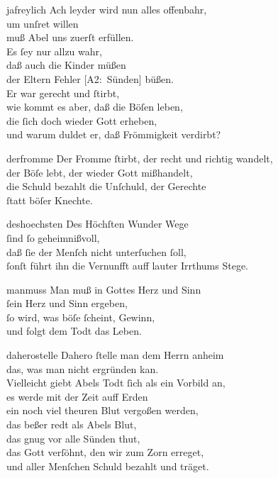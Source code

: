 \documentclass[abbrwidth=6em,tocstyle=ref-genre]{ees}
\newcommand\altlyrics[1]{[\textmd{A2}:~#1]}
\begin{document}
{\begin{movement}{jafreylich}
  \voice[Eva]
  Ach leyder wird nun alles offenbahr,\\
  um unſret willen\\
  muß Abel uns zuerſt erfüllen.\\
  Es ſey nur allzu wahr,\\
  daß auch die Kinder müßen\\
  der Eltern Fehler \altlyrics{Sünden} büßen.\\
  Er war gerecht und ſtirbt,\\
  wie kommt es aber, daß die Böſen leben,\\
  die ſich doch wieder Gott erheben,\\
  und warum duldet er, daß Frömmigkeit verdirbt?
\end{movement}

\begin{movement}{derfromme}
  \voice[Chor]
  Der Fromme ſtirbt, der recht und richtig wandelt,\\
  der Böſe lebt, der wieder Gott mißhandelt,\\
  die Schuld bezahlt die Unſchuld, der Gerechte\\
  ſtatt böſer Knechte.
\end{movement}

\begin{movement}{deshoechsten}
  \voice[Adam]
  Des Höchſten Wunder Wege\\
  ſind ſo geheimnißvoll,\\
  daß ſie der Menſch nicht unterſuchen ſoll,\\
  ſonſt führt ihn die Vernunfft auff lauter Irrthums Stege.
\end{movement}

\begin{movement}{manmuss}
  \voice[Chor]
  Man muß in Gottes Herz und Sinn\\
  ſein Herz und Sinn ergeben,\\
  ſo wird, was böſe ſcheint, Gewinn,\\
  und folgt dem Todt das Leben.
\end{movement}

\begin{movement}{daherostelle}
  \voice[Adam]
  Dahero ſtelle man dem Herrn anheim\\
  das, was man nicht ergründen kan.\\
  Vielleicht giebt Abels Todt ſich als ein Vorbild an,\\
  es werde mit der Zeit auff Erden\\
  ein noch viel theuren Blut vergoßen werden,\\
  das beßer redt als Abels Blut,\\
  das gnug vor alle Sünden thut,\\
  das Gott verſöhnt, den wir zum Zorn erreget,\\
  und aller Menſchen Schuld bezahlt und träget.
\end{movement}

}
\end{document}
